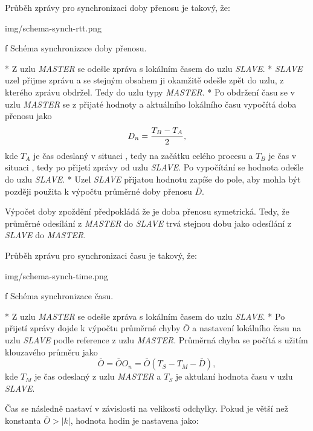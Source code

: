Průběh zprávy pro synchronizaci {\sbf doby přenosu} je takový, že:

\medskip
{}
\picw=16cm \cinspic img/schema-synch-rtt.png
\caption/f Schéma synchronizace doby přenosu.
\medskip

\begitems
* {\sbf [A]} Z uzlu {\em MASTER} se odešle zpráva s lokálním časem do uzlu {\em SLAVE}.
* {\sbf [B]} {\em SLAVE} uzel přijme zprávu a se stejným obsahem ji okamžitě odešle zpět do uzlu, z kterého zprávu obdržel. Tedy do uzlu typy {\em MASTER}.
* {\sbf [C]} Po obdržení času se v uzlu {\em MASTER} se z přijaté hodnoty a aktuálního lokálního času vypočítá doba přenosu jako
$$
D_n = {{T_B - T_A}\over{2}},
$$
kde $T_A$ je čas odeslaný v situaci {\sbf [A]}, tedy na začátku celého procesu a $T_B$ je čas v situaci {\sbf [C]}, tedy po přijetí zprávy od uzlu {\em SLAVE}. Po vypočítání se hodnota odešle do uzlu {\em SLAVE}.
* {\sbf [D]} Uzel {\em SLAVE} přijatou hodnotu zapíše do pole, aby mohla být později použita k výpočtu průměrné doby přenosu $\bar{D}$.
\enditems

Výpočet doby zpoždění předpokládá že je doba přenosu symetrická. Tedy, že průměrné odesílání z {\em MASTER} do {\em SLAVE} trvá stejnou dobu jako odesílání z {\em SLAVE} do {\em MASTER}.

Průběh zprávu pro synchronizaci {\sbf času} je takový, že:

\medskip
{}
\picw=16cm \cinspic img/schema-synch-time.png
\caption/f Schéma synchronizace času.
\medskip

\begitems
* {\sbf [A]} Z uzlu {\em MASTER} se odešle zpráva s lokálním časem do uzlu {\em SLAVE}.
* {\sbf [B]} Po přijetí zprávy dojde k výpočtu průměrné chyby $\bar{O}$ a nastavení lokálního času na uzlu {\em SLAVE} podle reference z uzlu {\em MASTER}. Průměrná chyba se počítá s užitím klouzavého průměru jako 
$$
\bar{O} = \bar{O} O_n = \bar{O} (T_S - T_M - \bar{D}),
$$
kde $T_M$ je čas odeslaný z uzlu {\em MASTER} a $T_S$ je aktulaní hodnota času v uzlu {\em SLAVE}.

Čas se následně nastaví v závislosti na velikosti odchylky. Pokud je větší než konstanta $\bar{O} > | k |$, hodnota hodin je nastavena jako:

